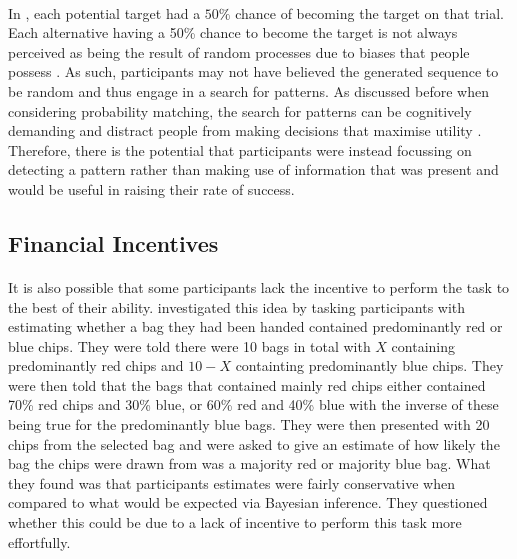 \documentclass[12pt]{article}
\begin{document}
\paragraph{} In \cite{clarke2015failure}, each potential target had a $50\%$ chance of becoming the target on that trial. Each alternative having a 50\% chance to become the target is not always perceived as being the result of random processes due to biases that people possess \citep{Ayton2004}. As such, participants may not have believed the generated sequence to be random and thus engage in a search for patterns. As discussed before when considering probability matching, the search for patterns can be cognitively demanding and distract people from making decisions that maximise utility \citep{wolford2004searching}. Therefore, there is the potential that participants were instead focussing on detecting a pattern rather than making use of information that was present and would be useful in raising their rate of success. 

\subsection*{Financial Incentives}

\paragraph{} It is also possible that some participants lack the incentive to perform the task to the best of their ability. \cite{phillips1966conservatism} investigated this idea by tasking participants with estimating whether a bag they had been handed contained predominantly red or blue chips. They were told there were 10 bags in total with $X$ containing predominantly red chips and $10 - X$ containting predominantly blue chips. They were then told that the bags that contained mainly red chips either contained 70\% red chips and 30\% blue, or 60\% red and 40\% blue with the inverse of these being true for the predominantly blue bags. They were then presented with 20 chips from the selected bag and were asked to give an estimate of how likely the bag the chips were drawn from was a majority red or majority blue bag. What they found was that participants estimates were fairly conservative when compared to what would be expected via Bayesian inference. They questioned whether this could be due to a lack of incentive to perform this task more effortfully. 
\end{document}
